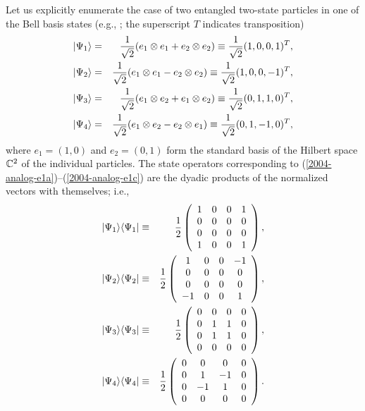 \documentclass[12pt]{iopart}
\begin{document}
Let us explicitly enumerate the case of two entangled two-state particles in
one of the Bell basis states (e.g., \cite{horo-96};  the superscript $T$ indicates transposition)
\begin{eqnarray}
\vert \Psi_1 \rangle &=& {1\over \sqrt{2}}( e_1 \otimes e_1 + e_2 \otimes e_2) \equiv {1\over \sqrt{2}}(1,0,0,1)^T, \label{2004-analog-e1a}\\
\vert \Psi_2 \rangle &=& {1\over \sqrt{2}}( e_1 \otimes e_1 - e_2 \otimes e_2) \equiv {1\over \sqrt{2}}(1,0,0,-1)^T, \label{2004-analog-e1b}\\
\vert \Psi_3 \rangle &=& {1\over \sqrt{2}}( e_1 \otimes e_2 + e_1 \otimes e_2) \equiv {1\over \sqrt{2}}(0,1,1,0)^T, \label{2004-analog-e1c}\\
\vert \Psi_4 \rangle &=& {1\over \sqrt{2}}( e_1 \otimes e_2 - e_2 \otimes e_1) \equiv {1\over \sqrt{2}}(0,1,-1,0)^T,\label{2004-analog-e1d}
\end{eqnarray}
where $e_1=(1,0)$ and $e_2=(0,1)$ form the standard basis of the Hilbert space
${\Bbb C}^2$
of the individual particles.
The state operators corresponding to
(\ref{2004-analog-e1a})--(\ref{2004-analog-e1c})
are the dyadic products of the normalized vectors with themselves; i.e.,
\begin{eqnarray}
\vert \Psi_1 \rangle \langle \Psi_1 \vert &\equiv &{1\over {2}}
\left(
\begin{array}{cccc}
1&0&0&1\\
0&0&0&0\\
0&0&0&0\\
1&0&0&1
\end{array}
\right)
, \label{2004-analog-e2a}\\
\vert \Psi_2 \rangle \langle \Psi_2 \vert &\equiv &{1\over {2}}
\left(
\begin{array}{cccc}
1&0&0&-1\\
0&0&0&0\\
0&0&0&0\\
-1&0&0&1
\end{array}
\right)
, \label{2004-analog-e2b}\\
\vert \Psi_3 \rangle \langle \Psi_3 \vert &\equiv &{1\over {2}}
\left(
\begin{array}{cccc}
0&0&0&0\\
0&1&1&0\\
0&1&1&0\\
0&0&0&0
\end{array}
\right)
, \label{2004-analog-e2c}\\
\vert \Psi_4 \rangle \langle \Psi_4 \vert &\equiv &{1\over {2}}
\left(
\begin{array}{cccc}
0&0&0&0\\
0&1&-1&0\\
0&-1&1&0\\
0&0&0&0
\end{array}
\right)
. \label{2004-analog-e2d}
\end{eqnarray}
\end{document}
